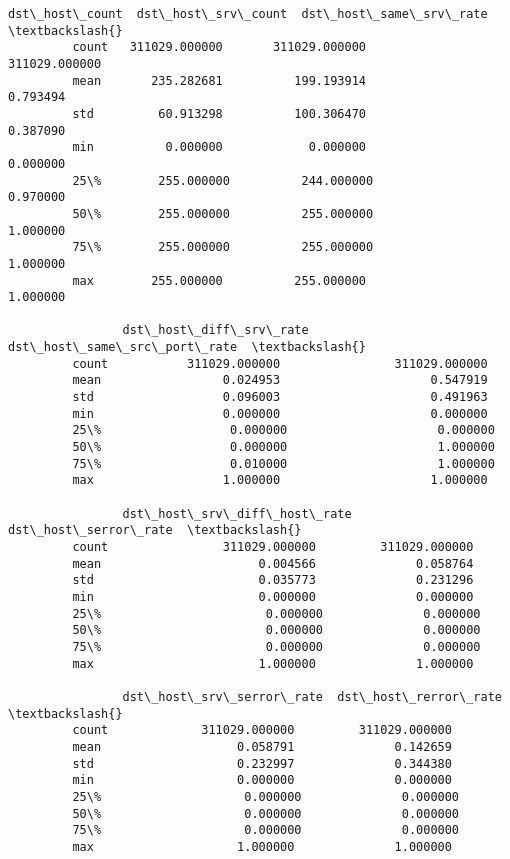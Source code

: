 \documentclass[11pt]{article}
\begin{document}
\begin{Verbatim}[commandchars=\\\{\}]
                dst\_host\_count  dst\_host\_srv\_count  dst\_host\_same\_srv\_rate  \textbackslash{}
         count   311029.000000       311029.000000           311029.000000   
         mean       235.282681          199.193914                0.793494   
         std         60.913298          100.306470                0.387090   
         min          0.000000            0.000000                0.000000   
         25\%        255.000000          244.000000                0.970000   
         50\%        255.000000          255.000000                1.000000   
         75\%        255.000000          255.000000                1.000000   
         max        255.000000          255.000000                1.000000   
         
                dst\_host\_diff\_srv\_rate  dst\_host\_same\_src\_port\_rate  \textbackslash{}
         count           311029.000000                311029.000000   
         mean                 0.024953                     0.547919   
         std                  0.096003                     0.491963   
         min                  0.000000                     0.000000   
         25\%                  0.000000                     0.000000   
         50\%                  0.000000                     1.000000   
         75\%                  0.010000                     1.000000   
         max                  1.000000                     1.000000   
         
                dst\_host\_srv\_diff\_host\_rate  dst\_host\_serror\_rate  \textbackslash{}
         count                311029.000000         311029.000000   
         mean                      0.004566              0.058764   
         std                       0.035773              0.231296   
         min                       0.000000              0.000000   
         25\%                       0.000000              0.000000   
         50\%                       0.000000              0.000000   
         75\%                       0.000000              0.000000   
         max                       1.000000              1.000000   
         
                dst\_host\_srv\_serror\_rate  dst\_host\_rerror\_rate  \textbackslash{}
         count             311029.000000         311029.000000   
         mean                   0.058791              0.142659   
         std                    0.232997              0.344380   
         min                    0.000000              0.000000   
         25\%                    0.000000              0.000000   
         50\%                    0.000000              0.000000   
         75\%                    0.000000              0.000000   
         max                    1.000000              1.000000   
         

\end{Verbatim}
\end{document}
